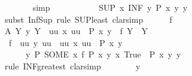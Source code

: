 \begin{isabellebody}
\ \ \ \ \ \ \isamarkupfalse%
\ simp\isanewline
\ \ \isamarkupfalse%
\isanewline
\ \ \isamarkupfalse%
\ \isamarkupfalse%
\ {\isachardoublequoteopen}{\isachardot}{\kern0pt}{\isachardot}{\kern0pt}{\isachardot}{\kern0pt}\ {\isasymle}\ \ {\isacharparenleft}{\kern0pt}SUP\ x{\isachardot}{\kern0pt}\ INF\ y{\isachardot}{\kern0pt}\ P\ {\isacharparenleft}{\kern0pt}x\ y{\isacharparenright}{\kern0pt}\ y{\isacharparenright}{\kern0pt}{\isachardoublequoteclose}\isanewline
\ \ \isamarkupfalse%
\ {\isacharparenleft}{\kern0pt}subst\ Inf{\isacharunderscore}{\kern0pt}Sup{\isacharcomma}{\kern0pt}\ rule\ SUP{\isacharunderscore}{\kern0pt}least{\isacharcomma}{\kern0pt}\ clarsimp{\isacharparenright}{\kern0pt}\isanewline
\ \ \ \ \isamarkupfalse%
\ f\isanewline
\ \ \ \ \isamarkupfalse%
\ A{\isacharcolon}{\kern0pt}\ {\isachardoublequoteopen}{\isasymforall}Y{\isachardot}{\kern0pt}\ {\isacharparenleft}{\kern0pt}{\isasymexists}y{\isachardot}{\kern0pt}\ Y\ {\isacharequal}{\kern0pt}\ {\isacharbraceleft}{\kern0pt}uu{\isachardot}{\kern0pt}\ {\isasymexists}x{\isachardot}{\kern0pt}\ uu\ {\isacharequal}{\kern0pt}\ P\ x\ y{\isacharbraceright}{\kern0pt}{\isacharparenright}{\kern0pt}\ {\isasymlongrightarrow}\ f\ Y\ {\isasymin}\ Y{\isachardoublequoteclose}\isanewline
\ \ \ \ \ \ \isanewline
\ \ \ \ \isamarkupfalse%
\ {\isachardoublequoteopen}\ {\isasymSqinter}{\isacharparenleft}{\kern0pt}f\ {\isacharbackquote}{\kern0pt}\ {\isacharbraceleft}{\kern0pt}uu{\isachardot}{\kern0pt}\ {\isasymexists}y{\isachardot}{\kern0pt}\ uu\ {\isacharequal}{\kern0pt}\ {\isacharbraceleft}{\kern0pt}uu{\isachardot}{\kern0pt}\ {\isasymexists}x{\isachardot}{\kern0pt}\ uu\ {\isacharequal}{\kern0pt}\ P\ x\ y{\isacharbraceright}{\kern0pt}{\isacharbraceright}{\kern0pt}{\isacharparenright}{\kern0pt}\ {\isasymle}\isanewline
\ \ \ \ \ \ {\isacharparenleft}{\kern0pt}{\isasymSqinter}y{\isachardot}{\kern0pt}\ P\ {\isacharparenleft}{\kern0pt}SOME\ x{\isachardot}{\kern0pt}\ f\ {\isacharbraceleft}{\kern0pt}P\ x\ y\ {\isacharbar}{\kern0pt}x{\isachardot}{\kern0pt}\ True{\isacharbraceright}{\kern0pt}\ {\isacharequal}{\kern0pt}\ P\ x\ y{\isacharparenright}{\kern0pt}\ y{\isacharparenright}{\kern0pt}{\isachardoublequoteclose}\isanewline
\ \ \ \ \isamarkupfalse%
\ {\isacharparenleft}{\kern0pt}rule\ INF{\isacharunderscore}{\kern0pt}greatest{\isacharcomma}{\kern0pt}\ clarsimp{\isacharparenright}{\kern0pt}\isanewline
\ \ \ \ \ \ \isamarkupfalse%
\ y\isanewline
\ \ \ \ \ \ \ \ \isamarkupfalse%

\end{isabellebody}
